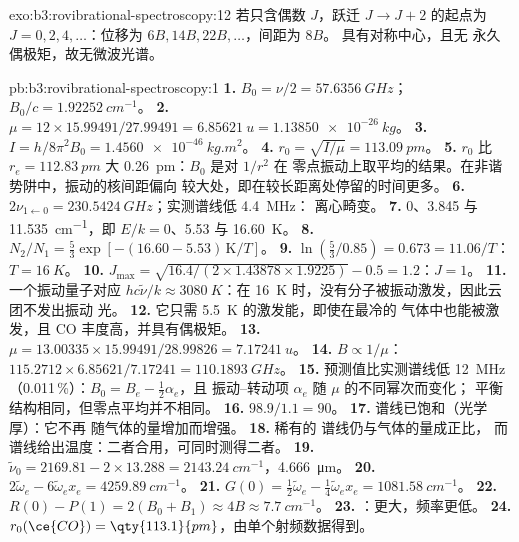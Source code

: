 \begin{solution}{exo:b3:rovibrational-spectroscopy:12}
若只含偶数 $J$，跃迁 $J \to J + 2$ 的起点为 $J = 0, 2, 4, \dots$：位移为
$6B, 14B, 22B, \dots$，间距为 $8B$。 具有对称中心，且无
永久偶极矩，故无微波光谱。
\end{solution}

\begin{solution}{pb:b3:rovibrational-spectroscopy:1}
\textbf{1.} $B_0 = \nu/2 = \qty{57.6356}{GHz}$；$B_0/c = \qty{1.92252}{cm^{-1}}$。
\textbf{2.} $\mu = 12 \times 15.99491/27.99491 = \qty{6.85621}{u} = \qty{1.13850e-26}{kg}$。
\textbf{3.} $I = h/8\pi^2B_0 = \qty{1.4560e-46}{kg.m^2}$。
\textbf{4.} $r_0 = \sqrt{I/\mu} = \qty{113.09}{pm}$。
\textbf{5.} $r_0$ 比 $r_e = \qty{112.83}{pm}$ 大 \qty{0.26}{pm}：$B_0$ 是对 $1/r^2$ 在
零点振动上取平均的结果。在非谐势阱中，振动的核间距偏向
较大处，即在较长距离处停留的时间更多。
\textbf{6.} $2\nu_{1\leftarrow0} = \qty{230.5424}{GHz}$；实测谱线低 \qty{4.4}{MHz}：
离心畸变。
\textbf{7.} $0$、3.845 与 \qty{11.535}{cm^{-1}}，即 $E/k = 0$、5.53 与 \qty{16.60}{K}。
\textbf{8.} $N_2/N_1 = \frac53\exp[-(16.60 - 5.53)\,\mathrm K/T]$。
\textbf{9.} $\ln(\frac53/0.85) = 0.673 = 11.06/T$：$T = \qty{16}{K}$。
\textbf{10.} $J_{\max} = \sqrt{16.4/(2 \times 1.43878 \times 1.9225)} - 0.5 = 1.2$：$J = 1$。
\textbf{11.} 一个振动量子对应 $hc\tilde\nu/k \approx \qty{3080}{K}$：在
\qty{16}{K} 时，没有分子被振动激发，因此云团不发出振动
光。
\textbf{12.} 它只需 \qty{5.5}{K} 的激发能，即使在最冷的
气体中也能被激发，且 CO 丰度高，并具有偶极矩。
\textbf{13.} $\mu = 13.00335 \times 15.99491/28.99826 = \qty{7.17241}{u}$。
\textbf{14.} $B \propto 1/\mu$：$115.2712 \times 6.85621/7.17241 = \qty{110.1893}{GHz}$。
\textbf{15.} 预测值比实测谱线低 \qty{12}{MHz}（0.011\,\%）：$B_0 = B_e - \frac12\alpha_e$，且
振动–转动项 $\alpha_e$ 随 $\mu$ 的不同幂次而变化；
平衡结构相同，但零点平均并不相同。
\textbf{16.} $98.9/1.1 = 90$。
\textbf{17.}  谱线已饱和（光学厚）：它不再
随气体的量增加而增强。
\textbf{18.} 稀有的  谱线仍与气体的量成正比，
而  谱线给出温度：二者合用，可同时测得二者。
\textbf{19.} $\tilde\nu_0 = 2169.81 - 2 \times 13.288 = \qty{2143.24}{cm^{-1}}$，\qty{4.666}{\micro m}。
\textbf{20.} $2\tilde\omega_e - 6\tilde\omega_ex_e = \qty{4259.89}{cm^{-1}}$。
\textbf{21.} $G(0) = \frac12\tilde\omega_e - \frac14\tilde\omega_ex_e = \qty{1081.58}{cm^{-1}}$。
\textbf{22.} $R(0) - P(1) = 2(B_0 + B_1) \approx 4B \approx \qty{7.7}{cm^{-1}}$。
\textbf{23.} ：更大，频率更低。
\textbf{24.} \textbf{$r_0(\ce{CO}) = \qty{113.1}{pm}$}，由单个射频数据得到。
\end{solution}
